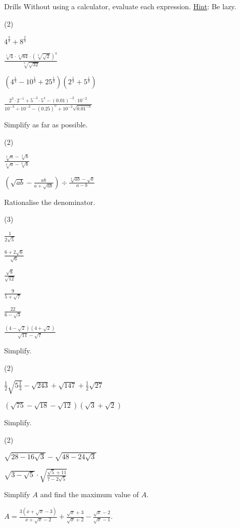 \begin{questions}{Drills}
Without using a calculator, evaluate each expression.
\underline{Hint}: Be lazy. %
\begin{question_set}(2)
    \item $4^{\frac{3}{2}}+8^{\frac{2}{3}}$
    \item $\frac{\sqrt[5]{4} \cdot \sqrt[4]{64} \cdot \left(\sqrt[3]{\sqrt{2}}\right)^{4}}{\sqrt[3]{\sqrt{32}}}$
    \item $\left(4^{\frac{1}{3}}-10^{\frac{1}{3}}+25^{\frac{1}{3}}\right)\left(2^{\frac{1}{3}}+5^{\frac{1}{3}}\right)$
    \item $\frac{2^{3} \cdot 2^{-1}+5^{-3} \cdot 5^{4}-(0.01)^{-2} \cdot 10^{-2}}{10^{-3} \div 10^{-2}-(0.25)^{0}+10^{-2}\sqrt{0.01^{-3}}}$
\end{question_set}

Simplify as far as possible.
\begin{question_set}(2)
    \item $\frac{\sqrt[3]{a}-\sqrt[3]{b}}{\sqrt[6]{a}-\sqrt[6]{b}}$
    \item $\left(\sqrt{ab} -\frac{ab}{a+\sqrt{ab}}\right) \div \frac{\sqrt[4]{ab}-\sqrt{b}}{a-b}$
\end{question_set}
Rationalise the denominator.
\begin{question_set}(3)
    \item $\frac{1}{2\sqrt{5}}$
    \item $\frac{6+2\sqrt{6}}{\sqrt{6}}$
    \item $\frac{\sqrt{8}}{\sqrt{12}}$
    \item $\frac{9}{5+\sqrt{7}}$
    \item $\frac{22}{6-\sqrt{3}}$
    \item $\frac{\left(4-\sqrt{2}\right)\left(4+\sqrt{2}\right)}{\sqrt{11}-\sqrt{7}}$
\end{question_set}
Simplify.
\begin{question_set}(2)
    \item $\frac{1}{2}\sqrt{5 \frac{1}{3}}-\sqrt{243}+\sqrt{147}+\frac{1}{2}\sqrt{27}$
    \item $\left(\sqrt{75}-\sqrt{18}-\sqrt{12}\right)\left(\sqrt{3}+\sqrt{2}\right)$
\end{question_set}
Simplify.
\begin{question_set}(2)
    \item $\sqrt{28-16\sqrt{3}}-\sqrt{48-24\sqrt{3}}$
    \item $\sqrt{3-\sqrt{5}} \cdot \sqrt{\frac{\sqrt{5}+11}{7-2\sqrt{5}}}$
\end{question_set}
Simplify $A$ and find the maximum value of $A$.

$A=\frac{3\left(x+\sqrt{x}-3\right)}{x+\sqrt{x}-2}+\frac{\sqrt{x}+3}{\sqrt{x}+2}-\frac{\sqrt{x}-2}{\sqrt{x}-1}$.
\end{questions}

